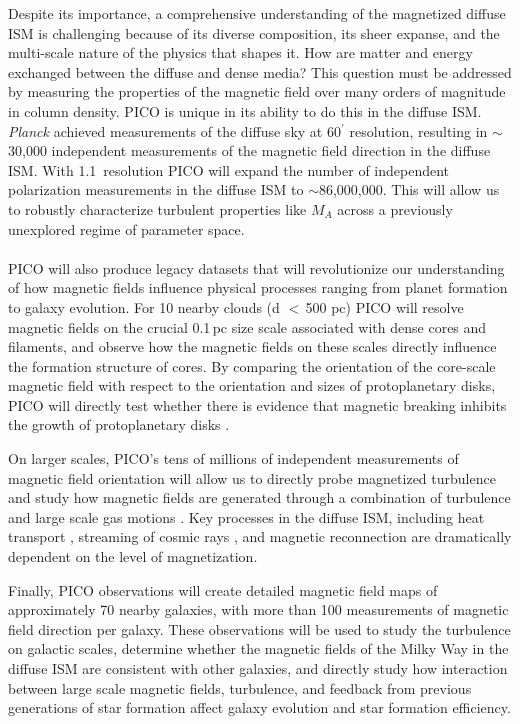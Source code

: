 \documentclass[PICOReport.tex]{subfiles}
\begin{document}
Despite its importance, a comprehensive understanding of the magnetized diffuse ISM is challenging because of its diverse composition, its sheer expanse, and the multi-scale nature of the physics that shapes it. How are matter and energy exchanged between the diffuse and dense media? This question must be addressed by measuring the properties of the magnetic field over many orders of magnitude in column density. PICO is unique in its ability to do this in the diffuse ISM. \textit{Planck} achieved measurements of the diffuse sky at 60$^\prime$ resolution, resulting in $\sim$30,000 independent measurements of the magnetic field direction in the diffuse ISM.  With 1.1\arcmin~resolution PICO will expand the number of independent polarization measurements in the diffuse ISM to $\sim$86,000,000. This will allow us to robustly characterize turbulent properties like $M_A$ across a previously unexplored regime of parameter space. \vspace{0.1in} \\
%
\\
PICO will also produce legacy datasets that will revolutionize our understanding of how magnetic fields influence physical processes ranging from planet formation to galaxy evolution.  For 10 nearby clouds (d $<$\,500 pc) PICO will resolve magnetic fields on the crucial 0.1\,pc size scale associated with dense cores and filaments, and observe how the magnetic fields on these scales directly influence the formation structure of cores.  By comparing the orientation of the core-scale magnetic field with respect to the orientation and sizes of protoplanetary disks, PICO will directly test whether there is evidence that magnetic breaking inhibits the growth of protoplanetary disks \citep{allen_2003,li_2014}. 

On larger scales, PICO's tens of millions of independent measurements of magnetic field orientation will allow us to directly probe magnetized turbulence and study how magnetic fields are generated through a combination of turbulence and large scale gas motions \citep{Xu_2018}.   Key processes in the diffuse ISM, including heat transport \citep{Lazarian:2006}, streaming of cosmic rays \citep{Lazarian:2016}, and magnetic reconnection \citep{Lazarian_Vishniac:1999} are dramatically dependent on the level of magnetization.

Finally, PICO observations will create detailed magnetic field maps of approximately 70 nearby galaxies, with more than 100 measurements of magnetic field direction per galaxy.  These observations will be used to study the turbulence on galactic scales, determine whether the magnetic fields of the Milky Way in the diffuse ISM are consistent with other galaxies, and directly study how interaction between large scale magnetic fields, turbulence, and feedback from previous generations of star formation affect galaxy evolution and star formation efficiency.
\end{document}
